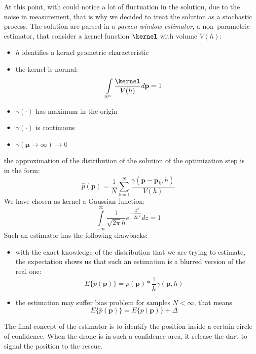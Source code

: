 At this point, with could notice a lot of fluctuation in the solution, due to the noise in measurement, that is why we decided to treat the solution as a stochastic process. The solution are parsed in a \emph{parzen window estimator}, a non--parametric estimator, that consider a kernel function $\kernel$ with volume $V(h)$:
\begin{itemize}
\item $h$ identifies a kernel geometric characteristic
\item the kernel is normal: 
\[ \int\limits_{\mathbb{R}^n} \dfrac{\kernel}{V(h)}d\mathbf{p} = 1 \]
\item $\gamma(\cdot)$ has maximum in the origin
\item $\gamma(\cdot)$ is continuous
\item $\gamma(\pmb{\mu}\rightarrow\infty)\rightarrow 0$
\end{itemize}
the approximation of the distribution of the solution of the optimization step is in the form:
\begin{equation}
\hat{p}(\mathbf{p}) = \dfrac{1}{N}\sum\limits_{k=1}^{N} \dfrac{\gamma(\mathbf{p}-\mathbf{p}_k,h)}{V(h)}
\end{equation}
We have chosen as kernel a Gaussian function: 
\[ \int\limits_{-\infty}^{\infty} \dfrac{1}{\sqrt{2\pi} h} e^{-\dfrac{z^2}{2 h^2}} dz = 1 \]
Such an estimator has the following drawbacks:
\begin{itemize}
\item with the exact knowledge of the distribution that we are trying to estimate, the expectation shows us that such an estimation is a blurred version of the real one: \[{E\{\hat{p}(\mathbf{p})\} = p(\mathbf{p}) * \dfrac{1}{h} \gamma(\mathbf{p},h)}\]
\item the estimation may suffer bias problem for samples $N<\infty$, that means \[{E\{\hat{p}(\mathbf{p})\}=E\{{p}(\mathbf{p})\} + \Delta}\]
\end{itemize}

The final concept of the estimator is to identify the position inside a certain circle of confidence. When the drone is in such a confidence area, it release the dart to signal the position to the rescue.